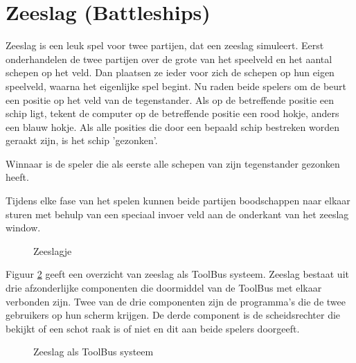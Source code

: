 \section*{Zeeslag (Battleships)}

Zeeslag is een leuk spel voor twee partijen, dat een zeeslag simuleert.
Eerst onderhandelen de twee partijen over de grote van het speelveld en
het aantal schepen op het veld. Dan plaatsen ze ieder voor zich de
schepen op hun eigen speelveld, waarna het eigenlijke spel begint. Nu raden
beide spelers om de beurt een positie op het veld van de tegenstander.
Als op de betreffende positie een schip ligt, tekent de computer op 
de betreffende positie een rood hokje, anders een blauw hokje.
Als alle posities die door een bepaald schip bestreken worden geraakt
zijn, is het schip 'gezonken'.

Winnaar is de speler die als eerste alle schepen van zijn tegenstander
gezonken heeft.

Tijdens elke fase van het spelen kunnen beide partijen boodschappen
naar elkaar sturen met behulp van een speciaal invoer veld aan de onderkant
van het zeeslag window.

\begin{figure}[htb]
\centerline{}
\caption{Zeeslagje}
\label{battleships}
\end{figure}

Figuur \ref{zeeslag} geeft een overzicht van zeeslag als ToolBus systeem.
Zeeslag bestaat uit drie afzonderlijke componenten die doormiddel van de
ToolBus met elkaar verbonden zijn. Twee van de drie componenten zijn de
programma's die de twee gebruikers op hun scherm krijgen. De derde
component is de scheidsrechter die bekijkt of een schot raak is of niet
en dit aan beide spelers doorgeeft.

\begin{figure}[htb]
\centerline{}
\caption{Zeeslag als ToolBus systeem}
\label{zeeslag}
\end{figure}



